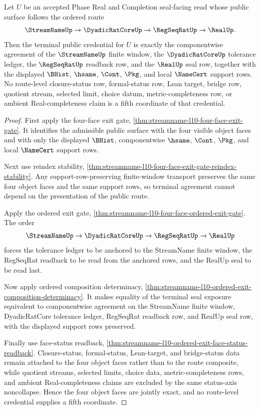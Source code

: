 \begin{theorem}
\label{thm:streamname-l10-four-face-terminal-coherence}
Let $U$ be an accepted Phase Real and Completion seal-facing read whose public surface follows the ordered route
$$
\StreamNameUp \to \DyadicRatCoreUp \to \RegSeqRatUp \to \RealUp .
$$
Then the terminal public credential for $U$ is exactly the componentwise agreement of the $\StreamNameUp$ finite window, the $\DyadicRatCoreUp$ tolerance ledger, the $\RegSeqRatUp$ readback row, and the $\RealUp$ seal row, together with the displayed $\BHist$, $\hsame$, $\Cont$, $\Pkg$, and local $\NameCert$ support rows. No route-level closure-status row, formal-status row, Lean target, bridge row, quotient stream, selected limit, choice datum, metric-completeness row, or ambient Real-completeness claim is a fifth coordinate of that credential.
\end{theorem}
\begin{proof}
First apply the four-face exit gate, \autoref{thm:streamname-l10-four-face-exit-gate}. It identifies the admissible public surface with the four visible object faces and with only the displayed $\BHist$, componentwise $\hsame$, $\Cont$, $\Pkg$, and local $\NameCert$ support rows.

Next use reindex stability, \autoref{thm:streamname-l10-four-face-exit-gate-reindex-stability}. Any support-row-preserving finite-window transport preserves the same four object faces and the same support rows, so terminal agreement cannot depend on the presentation of the public route.

Apply the ordered exit gate, \autoref{thm:streamname-l10-four-face-ordered-exit-gate}. The order
$$
\StreamNameUp \to \DyadicRatCoreUp \to \RegSeqRatUp \to \RealUp
$$
forces the tolerance ledger to be anchored to the StreamName finite window, the RegSeqRat readback to be read from the anchored rows, and the RealUp seal to be read last.

Now apply ordered composition determinacy, \autoref{thm:streamname-l10-ordered-exit-composition-determinacy}. It makes equality of the terminal seal exposure equivalent to componentwise agreement on the StreamName finite window, DyadicRatCore tolerance ledger, RegSeqRat readback row, and RealUp seal row, with the displayed support rows preserved.

Finally use face-status readback, \autoref{thm:streamname-l10-ordered-exit-face-status-readback}. Closure-status, formal-status, Lean-target, and bridge-status data remain attached to the four object faces rather than to the route composite, while quotient streams, selected limits, choice data, metric-completeness rows, and ambient Real-completeness claims are excluded by the same status-axis noncollapse. Hence the four object faces are jointly exact, and no route-level credential supplies a fifth coordinate.
\end{proof}


